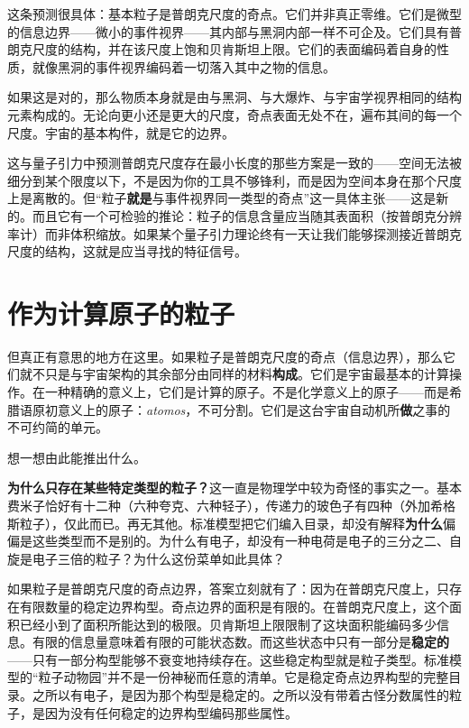 \documentclass[11pt, twoside, openright]{book}
\begin{document}
这条预测很具体：基本粒子是普朗克尺度的奇点。它们并非真正零维。它们是微型的信息边界------微小的事件视界------其内部与黑洞内部一样不可企及。它们具有普朗克尺度的结构，并在该尺度上饱和贝肯斯坦上限。它们的表面编码着自身的性质，就像黑洞的事件视界编码着一切落入其中之物的信息。

如果这是对的，那么物质本身就是由与黑洞、与大爆炸、与宇宙学视界相同的结构元素构成的。无论向更小还是更大的尺度，奇点表面无处不在，遍布其间的每一个尺度。宇宙的基本构件，就是它的边界。

这与量子引力中预测普朗克尺度存在最小长度的那些方案是一致的------空间无法被细分到某个限度以下，不是因为你的工具不够锋利，而是因为空间本身在那个尺度上是离散的。但“粒子\textbf{就是}与事件视界同一类型的奇点”这一具体主张------这是新的。而且它有一个可检验的推论：粒子的信息含量应当随其表面积（按普朗克分辨率计）而非体积缩放。如果某个量子引力理论终有一天让我们能够探测接近普朗克尺度的结构，这就是应当寻找的特征信号。

\section*{作为计算原子的粒子}

但真正有意思的地方在这里。如果粒子是普朗克尺度的奇点（信息边界），那么它们就不只是与宇宙架构的其余部分由同样的材料\textbf{构成}。它们是宇宙最基本的计算操作。在一种精确的意义上，它们是计算的原子。不是化学意义上的原子------而是希腊语原初意义上的原子：\textit{atomos}，不可分割。它们是这台宇宙自动机所\textbf{做}之事的不可约简的单元。

想一想由此能推出什么。

\textbf{为什么只存在某些特定类型的粒子？}这一直是物理学中较为奇怪的事实之一。基本费米子恰好有十二种（六种夸克、六种轻子），传递力的玻色子有四种（外加希格斯粒子），仅此而已。再无其他。标准模型把它们编入目录，却没有解释\textbf{为什么}偏偏是这些类型而不是别的。为什么有电子，却没有一种电荷是电子的三分之二、自旋是电子三倍的粒子？为什么这份菜单如此具体？

如果粒子是普朗克尺度的奇点边界，答案立刻就有了：因为在普朗克尺度上，只存在有限数量的稳定边界构型。奇点边界的面积是有限的。在普朗克尺度上，这个面积已经小到了面积所能达到的极限。贝肯斯坦上限限制了这块面积能编码多少信息。有限的信息量意味着有限的可能状态数。而这些状态中只有一部分是\textbf{稳定的}------只有一部分构型能够不衰变地持续存在。这些稳定构型就是粒子类型。标准模型的“粒子动物园”并不是一份神秘而任意的清单。它是稳定奇点边界构型的完整目录。之所以有电子，是因为那个构型是稳定的。之所以没有带着古怪分数属性的粒子，是因为没有任何稳定的边界构型编码那些属性。
\end{document}
